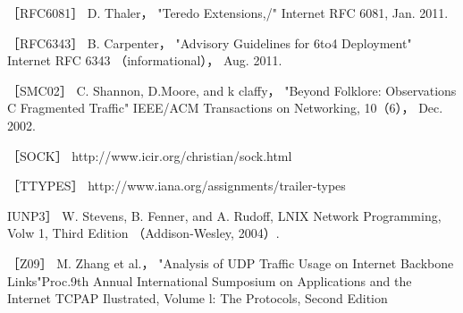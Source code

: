 ［RFC6081］ D. Thaler， "Teredo Extensions,/" Internet RFC 6081, Jan. 2011.

［RFC6343］ B. Carpenter， "Advisory Guidelines for 6to4 Deployment" Internet
RFC 6343 （informational）， Aug. 2011.

［SMC02］ C. Shannon, D.Moore, and k claffy， "Beyond Folklore: Observations C
Fragmented Traffic" IEEE/ACM Transactions on Networking, 10（6）， Dec. 2002.

［SOCK］ http://www.icir.org/christian/sock.html

［TTYPES］ http://www.iana.org/assignments/trailer-types

IUNP3］ W. Stevens, B. Fenner, and A. Rudoff, LNIX Network Programming, Volw
1, Third Edition （Addison-Wesley, 2004）.

［Z09］ M. Zhang et al.， "Analysis of UDP Traffic Usage on Internet Backbone
Links"Proc.9th Annual International Sumposium on Applications and the Internet
TCPAP Ilustrated, Volume l: The Protocols, Second Edition
